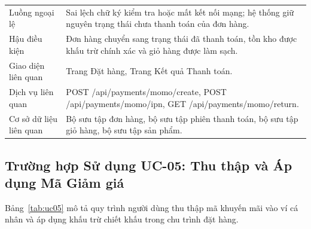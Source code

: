 \begin{table}[H]
\begin{tabularx}{\textwidth}{p{3.5cm}X}
Luồng ngoại lệ & Sai lệch chữ ký kiểm tra hoặc mất kết nối mạng; hệ thống giữ nguyên trạng thái chưa thanh toán của đơn hàng. \\
Hậu điều kiện & Đơn hàng chuyển sang trạng thái đã thanh toán, tồn kho được khấu trừ chính xác và giỏ hàng được làm sạch. \\
Giao diện liên quan & Trang Đặt hàng, Trang Kết quả Thanh toán. \\
Dịch vụ liên quan & POST /api/payments/momo/create, POST /api/payments/momo/ipn, GET /api/payments/momo/return. \\
Cơ sở dữ liệu liên quan & Bộ sưu tập đơn hàng, bộ sưu tập phiên thanh toán, bộ sưu tập giỏ hàng, bộ sưu tập sản phẩm. \\
\bottomrule
\end{tabularx}
\end{table}

\subsection{Trường hợp Sử dụng UC-05: Thu thập và Áp dụng Mã Giảm giá}
Bảng~\ref{tab:uc05} mô tả quy trình người dùng thu thập mã khuyến mãi vào ví cá nhân và áp dụng khấu trừ chiết khấu trong chu trình đặt hàng.

